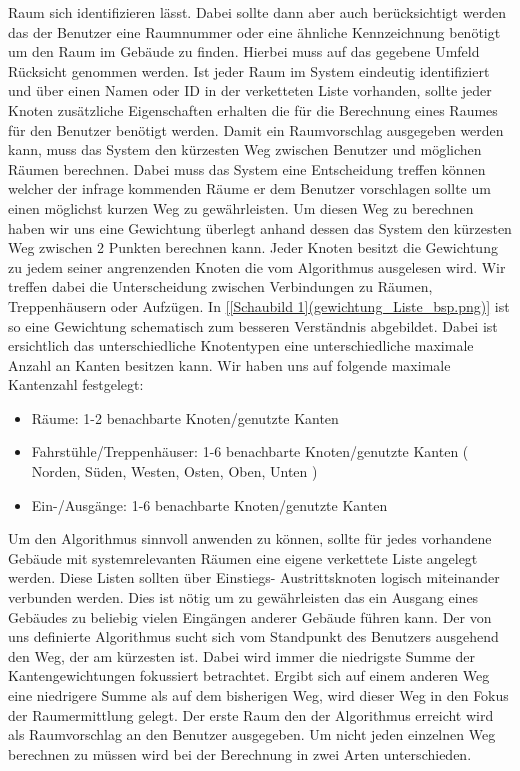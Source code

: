 Raum sich identifizieren lässt. Dabei sollte dann aber auch berücksichtigt
werden das der Benutzer eine Raumnummer oder eine ähnliche Kennzeichnung
benötigt um den Raum im Gebäude zu finden. Hierbei muss auf das gegebene Umfeld
Rücksicht genommen werden.
Ist jeder Raum im System eindeutig identifiziert und über einen Namen oder ID
in der verketteten Liste vorhanden, sollte jeder Knoten zusätzliche
Eigenschaften erhalten die für die Berechnung eines Raumes für den Benutzer
benötigt werden.
Damit ein Raumvorschlag ausgegeben werden kann, muss das System den kürzesten
Weg zwischen Benutzer und möglichen Räumen berechnen. Dabei muss das System
eine Entscheidung treffen können welcher der infrage kommenden Räume er dem
Benutzer vorschlagen sollte um einen möglichst kurzen Weg zu gewährleisten.
Um diesen Weg zu berechnen haben wir uns eine Gewichtung überlegt anhand dessen
das System den kürzesten Weg zwischen 2 Punkten berechnen kann. Jeder Knoten
besitzt die Gewichtung zu jedem seiner angrenzenden Knoten die vom Algorithmus
ausgelesen wird. Wir treffen dabei die Unterscheidung zwischen Verbindungen zu
Räumen, Treppenhäusern oder Aufzügen.
In \ref{[Schaubild 1](gewichtung_Liste_bsp.png)} ist so eine Gewichtung
schematisch zum besseren Verständnis abgebildet. Dabei ist ersichtlich das
unterschiedliche Knotentypen eine unterschiedliche maximale Anzahl an Kanten
besitzen kann. Wir haben uns auf folgende maximale Kantenzahl festgelegt:

\begin{itemize}
	\item Räume: 1-2 benachbarte Knoten/genutzte Kanten
	\item Fahrstühle/Treppenhäuser: 1-6 benachbarte Knoten/genutzte Kanten ( Norden, Süden, Westen, Osten, Oben, Unten )
	\item Ein-/Ausgänge: 1-6 benachbarte Knoten/genutzte Kanten
\end{itemize}

Um den Algorithmus sinnvoll anwenden zu können, sollte für jedes vorhandene
Gebäude mit systemrelevanten Räumen eine eigene verkettete Liste angelegt
werden. Diese Listen sollten über Einstiegs- \bzw Austrittsknoten logisch
miteinander verbunden werden. Dies ist nötig um zu gewährleisten das ein
Ausgang eines Gebäudes zu beliebig vielen Eingängen anderer Gebäude führen
kann.
Der von uns definierte Algorithmus sucht sich vom Standpunkt des Benutzers
ausgehend den Weg, der am kürzesten ist. Dabei wird immer die niedrigste Summe
der Kantengewichtungen fokussiert betrachtet. Ergibt sich auf einem anderen Weg
eine niedrigere Summe als auf dem bisherigen Weg, wird dieser Weg in den Fokus
der Raumermittlung gelegt. Der erste Raum den der Algorithmus erreicht wird als
Raumvorschlag an den Benutzer ausgegeben. 
Um nicht jeden einzelnen Weg berechnen zu müssen wird bei der Berechnung in
zwei Arten unterschieden.

